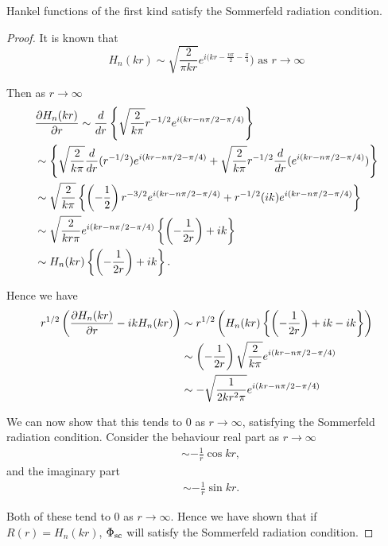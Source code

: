 \begin{propn}
  Hankel functions of the first kind satisfy the Sommerfeld radiation condition.
\end{propn}
\begin{proof}
  It is known that \parencite{martin06scattering}
  \begin{equation}
    H_n(kr) \sim \sqrt{\frac{2}{\pi kr}} e^{i(kr - \frac{n\pi}{2} - \frac{\pi}{4}}) \text{ as } r \rightarrow \infty
  \end{equation}

  Then as $r\rightarrow\infty$
  \begin{align*}
    &\frac{\partial H_n(kr)}{\partial r}
    \sim \frac{d}{dr} \left\{
    \sqrt{\frac{2}{k\pi}} r^{-1/2} e^{i(kr - n\pi/2- \pi/4)}
    \right\}\\
    &\sim\left\{
    \sqrt{\frac{2}{k\pi}} \frac{d}{dr} (r^{-1/2}) e^{i(kr - n\pi/2- \pi/4)}
    + \sqrt{\frac{2}{k\pi}} r^{-1/2} \frac{d}{dr}(e^{i(kr - n\pi/2- \pi/4)})
    \right\} \\
    &\sim \sqrt{\frac{2}{k\pi}} \left\{
    \left(-\frac{1}{2} \right) r^{-3/2} e^{i(kr - n\pi/2- \pi/4)} + r^{-1/2} (ik) e^{i(kr - n\pi/2- \pi/4)}
    \right\} \\
    &\sim \sqrt{\frac{2}{kr\pi}} e^{i(kr - n\pi/2- \pi/4)} \left\{
    \left(-\frac{1}{2r} \right) + ik
    \right\} \\
    &\sim H_n(kr) \left\{
    \left(-\frac{1}{2r} \right) + ik
    \right\}.
  \end{align*}

  Hence we have
  \begin{align*}
    r^{1/2} \left(
      \frac{\partial H_n(kr)}{\partial r} - ik H_n(kr)
    \right) &\sim r^{1/2} \left(
    H_n(kr) \left\{
    \left(-\frac{1}{2r} \right) + ik - ik
    \right\}
    \right)\\
    & \sim \left(-\frac{1}{2r} \right)
      \sqrt{\frac{2}{k\pi}} e^{i(kr - n\pi/2- \pi/4)} \\
    & \sim -\sqrt{\frac{1}{2kr^2\pi}} e^{i(kr - n\pi/2- \pi/4)}\\
  \end{align*}

  We can now show that this tends to $0$ as $r\rightarrow\infty$, satisfying the Sommerfeld radiation condition. Consider the behaviour real part as $r\rightarrow\infty$
  \begin{align*}
    & \sim -\frac{1}{r} \cos{kr},
  \end{align*}
  and the imaginary part
  \begin{align*}
    & \sim -\frac{1}{r} \sin{kr}.
  \end{align*}

  Both of these tend to $0$ as $r\rightarrow\infty$. Hence we have shown that if $R(r)=H_n(kr)$, $\Phi_{\text{sc}}$ will satisfy the Sommerfeld radiation condition.
\end{proof}

